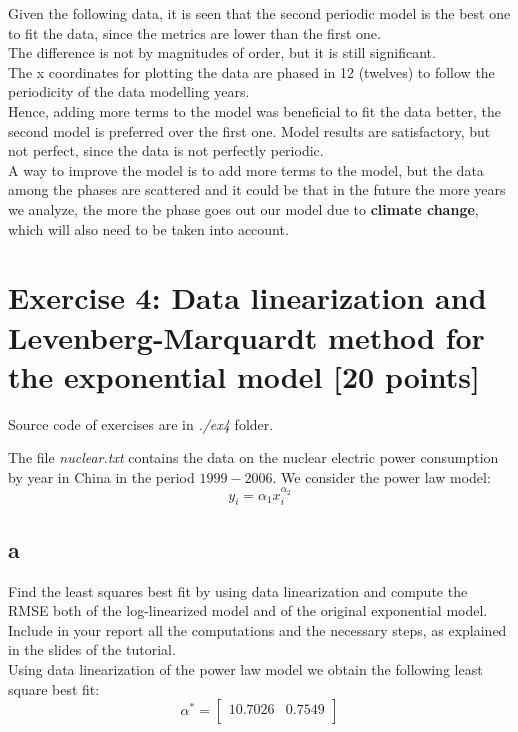 \documentclass[unicode,11pt,a4paper,oneside,numbers=endperiod,openany]{scrartcl}
\begin{document}
Given the following data, it is seen that the second periodic model is the best one to fit the data,
since the metrics are lower than the first one.\\
The difference is not by magnitudes of order, but it is still significant.\\
The x coordinates for plotting the data are phased in 12 (twelves) to follow the periodicity of the data modelling years.\\
Hence, adding more terms to the model was beneficial to fit the data better, the second model is preferred over the first one.
Model results are satisfactory, but not perfect, since the data is not perfectly periodic.\\
A way to improve the model is to add more terms to the model, but the data among the phases are scattered and it
could be that in the future the more years we analyze, the more the phase goes out our model due to \textbf{climate change},
which will also need to be taken into account. \\

\section*{Exercise 4: Data linearization and Levenberg-Marquardt method for the exponential model [20 points]}

Source code of exercises are in \textit{./ex4} folder.

The file \textit{nuclear.txt} contains the data on the nuclear electric power consumption by year in China in the period
$1999-2006$. We consider the power law model:
\[
    y_i = \alpha_1 x_i^{\alpha_2}
\]

\subsection*{a}
Find the least squares best fit by using data linearization and compute the RMSE both of the log-linearized
model and of the original exponential model. Include in your report all the computations and the necessary
steps, as explained in the slides of the tutorial.\\

Using data linearization of the power law model we obtain the following least square best fit:
\[
    \alpha^* = \begin{bmatrix} 10.7026 & 0.7549 \\ \end{bmatrix}
\]
\end{document}
